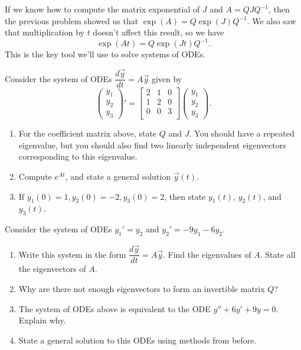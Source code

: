 If we know how to compute the matrix exponential of $J$ and $A=QJQ^{-1}$, then the previous problem showed us that 
$\exp (A) = Q \exp(J) Q^{-1}.$ 
We also saw that multiplication by $t$ doesn't affect this result, so we have 
$$\exp (At) = Q \exp(Jt) Q^{-1}.$$ 
This is the key tool we'll use to solve systems of ODEs. 

\begin{problem}
 Consider the system of ODEs $\dfrac{d\vec y}{dt} = A\vec y$ given by  
$$
\begin{pmatrix}
y_1\\
y_2\\ 
y_3
\end{pmatrix}'
=
\begin{bmatrix}
 2&1&0\\
 1&2&0\\
 0&0&3\\
\end{bmatrix}
\begin{pmatrix}
y_1\\
y_2\\ 
y_3
\end{pmatrix}.
$$
\begin{enumerate}
 \item For the coefficient matrix above, state $Q$ and $J$. You should have a repeated eigenvalue, but you should also find two linearly independent eigenvectors corresponding to this eigenvalue. 
 \item Compute $e^{At}$, and state a general solution $\vec y(t)$. 
 \item If $y_1(0)=1, y_2(0)=-2, y_3(0)=2$, then state $y_1(t)$, $y_2(t)$, and $y_3(t)$.  
\end{enumerate}

\end{problem}

\begin{problem}
 Consider the system of ODEs $y_1' = y_2$ and $y_2'=-9y_1-6y_2$. 
\begin{enumerate}
 \item Write this system in the form $\dfrac{d\vec y}{dt} = A\vec y$. Find the eigenvalues of $A$.  State all the eigenvectors of $A$. 
 \item Why are there not enough eigenvectors to form an invertible matrix $Q$?
 \item The system of ODEs above is equivalent to the ODE $y''+6y'+9y=0$. Explain why.
 \item State a general solution to this ODEs using methods from before.
\end{enumerate}
\end{problem}

